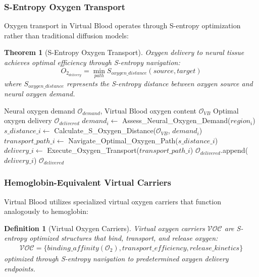 \documentclass[12pt,a4paper]{article}
\newtheorem{theorem}{Theorem}
\newtheorem{definition}{Definition}
\begin{document}
\subsubsection{S-Entropy Oxygen Transport}

Oxygen transport in Virtual Blood operates through S-entropy optimization rather than traditional diffusion models:

\begin{theorem}[S-Entropy Oxygen Transport]
Oxygen delivery to neural tissue achieves optimal efficiency through S-entropy navigation:
\begin{equation}
O_2_{delivery} = \min_{path} S_{oxygen\_distance}(source, target)
\end{equation}
where $S_{oxygen\_distance}$ represents the S-entropy distance between oxygen source and neural oxygen demand.
\end{theorem}

\begin{algorithm}
\caption{S-Entropy Oxygen Delivery}
\begin{algorithmic}[1]
\Require Neural oxygen demand $\mathcal{O}_{demand}$, Virtual Blood oxygen content $\mathcal{O}_{VB}$
\Ensure Optimal oxygen delivery $\mathcal{O}_{delivered}$
    \State $demand_i \leftarrow$ Assess\_Neural\_Oxygen\_Demand($region_i$)
    \State $s\_distance\_i \leftarrow$ Calculate\_S\_Oxygen\_Distance($\mathcal{O}_{VB}$, $demand_i$)
    \State $transport\_path\_i \leftarrow$ Navigate\_Optimal\_Oxygen\_Path($s\_distance\_i$)
    \State $delivery\_i \leftarrow$ Execute\_Oxygen\_Transport($transport\_path\_i$)
    \State $\mathcal{O}_{delivered}$.append($delivery\_i$)
\EndFor
\State \Return $\mathcal{O}_{delivered}$
\end{algorithmic}
\end{algorithm}

\subsubsection{Hemoglobin-Equivalent Virtual Carriers}

Virtual Blood utilizes specialized virtual oxygen carriers that function analogously to hemoglobin:

\begin{definition}[Virtual Oxygen Carriers]
Virtual oxygen carriers $\mathcal{VOC}$ are S-entropy optimized structures that bind, transport, and release oxygen:
\begin{align}
\mathcal{VOC} = \{binding\_affinity(\mathcal{O}_2), transport\_efficiency, release\_kinetics\}
\end{align}
optimized through S-entropy navigation to predetermined oxygen delivery endpoints.
\end{definition}
\end{document}
